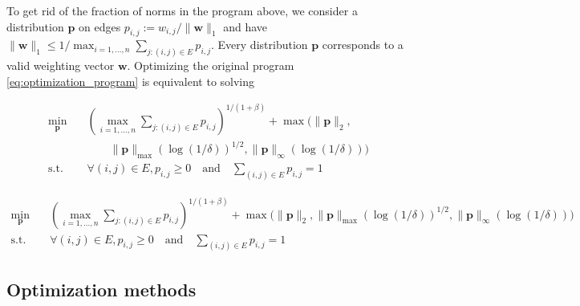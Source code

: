 \documentclass[letterpaper]{article} %
\def\DoubleColumn{}
\def\DoubleColumnEnd{}
\def\SingleColumn{}
\def\SingleColumnEnd{}
\newcommand{\weight}{\mathbf{w}}
\newcommand{\probdistri}{\mathbf{p}}
\newcommand{\pair}[1]{(#1)}
\newcommand{\normo}[1]{\|#1\|_1}
\newcommand{\complexbound}{\beta}
\begin{document}
To get rid of the fraction of norms in the program above, we consider a distribution $\probdistri{}$ on edges $p_{i,j}:=w_{i,j}/\normo{\weight{}}$ and have 
$\normo{\weight{}} \le 1/\max_{i=1,\dots,n} \sum_{j:\pair{i,j}\in E} p_{i,j}.$
Every distribution $\probdistri{}$ corresponds to a valid weighting vector $\weight{}$. 
Optimizing the original program \eqref{eq:optimization_program} is equivalent to solving
\DoubleColumn
\begin{equation}
    \label{eq:optimization_program_1}
\begin{aligned}
    \min_{\probdistri{}} \quad&
    (\max_{i=1,\dots,n} \sum_{j:\pair{i,j}\in E} p_{i,j})^{1/(1+\complexbound{})}+\max\Big(\|\probdistri{}\|_2,\\
    &\qquad\|\probdistri{}\|_{\max}(\log(1/\delta))^{1/2},
    \|\probdistri{}\|_\infty(\log(1/\delta))\Big)\\
    \mbox{s.t.} \quad& \forall \pair{i,j}\in E, p_{i,j}\ge 0 \quad \mbox{and} \quad \sum_{\pair{i,j}\in E} p_{i,j}= 1
\end{aligned}
\end{equation}
\DoubleColumnEnd
\SingleColumn
\begin{equation}
    \label{eq:optimization_program_1}
\begin{aligned}
    \min_{\probdistri{}} &\quad
    (\max_{i=1,\dots,n} \sum_{j:\pair{i,j}\in E} p_{i,j})^{1/(1+\complexbound{})}+\max\Big(\|\probdistri{}\|_2,\|\probdistri{}\|_{\max}(\log(1/\delta))^{1/2},
    \|\probdistri{}\|_\infty(\log(1/\delta))\Big)\\
    \mbox{s.t.} &\quad \forall \pair{i,j}\in E, p_{i,j}\ge 0 \quad \mbox{and} \quad \sum_{\pair{i,j}\in E} p_{i,j}= 1
\end{aligned}
\end{equation}
\SingleColumnEnd


\subsection{Optimization methods} %
\label{sub:optimization}
\end{document}
